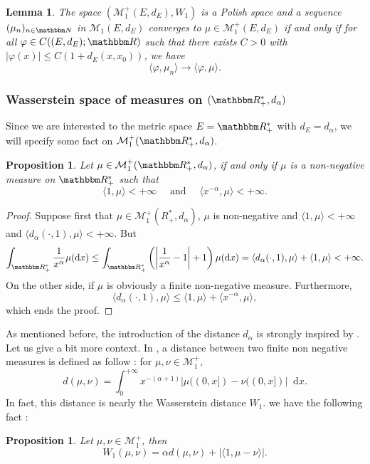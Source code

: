 \documentclass[a4paper,11pt, reqno]{amsart}
\newcommand{\cM}{\mathcal{M}}	\newcommand{\MM}{\mathbbm{M}}
\newcommand{\dd}{\mathop{}\!\mathrm{d}}
\newcommand{\1}{\mathbbm{1}}
\theoremstyle{plain}
\newtheorem{lemma}[theorem]{Lemma}
\newtheorem{proposition}[theorem]{Proposition}
\theoremstyle{definition}
\begin{document}
\begin{lemma}
  \label{lemma:CV-Wasserstein-linear}The space $(\cM_1^+ (E, d_E),
  W_1)$ is a Polish space and a sequence $(\mu_n)_{n \in \NN}$ in
  $\cM_1 (E, d_E)$ converges to $\mu \in \cM_1^+ (E, d_E)$ if
  and only if for all $\varphi \in C ((E, d_E) ; \RR)$ such that
  there exists $C > 0$ with $| \varphi (x) | \le C (1 + d_E (x, x_0))$,
  we have
  \[ \langle \varphi, \mu_n \rangle \rightarrow \langle \varphi, \mu \rangle .
  \]
\end{lemma}

\subsubsection{Wasserstein space of measures on $(\RR_+^{\ast},
d_{\alpha})$}

Since we are interested to the metric space $E =\RR_+^{\ast}$ with $d_E
= d_{\alpha}$, we will specify some fact on $\cM_1^+
(\RR_+^{\ast}, d_{\alpha})$.

\begin{proposition}
  \label{prop:equivalence-M1}Let $\mu \in \cM_1^+
  (\RR_+^{\ast}, d_{\alpha})$, if and only if $\mu$ is a non-negative
  measure on $\RR_+^{\ast}$ such that
  \[ \langle 1, \mu \rangle < + \infty \quad  \text{ and } \quad \langle x^{-
     \alpha}, \mu \rangle < + \infty . \]
\end{proposition}

\begin{proof}
  Suppose first that $\mu \in \cM_1^+ (R^{\ast}_+, d_{\alpha})$, $\mu$
  is non-negative and $\langle 1, \mu \rangle < + \infty$ and $\langle
  d_{\alpha} ( \cdot, 1), \mu \rangle < + \infty$. But
  \[ \int_{\RR^{\ast}_+} \frac{1}{x^{\alpha}} \mu (\dd x) \le
     \int_{\RR^{\ast}_+} \left( \left| \frac{1}{x^{\alpha}} - 1 \right|
     + 1 \right) \mu (\dd x) = \langle d_{\alpha} (\cdot, 1),
     \mu \rangle + \langle 1, \mu \rangle < + \infty . \]
  On the other side, if $\mu$ is obviously a finite non-negative measure.
  Furthermore,
  \[ \langle d_{\alpha} ( \cdot, 1), \mu \rangle \le \langle
     1, \mu \rangle + \langle x^{- \alpha}, \mu \rangle, \]
  which ends the proof.
\end{proof}

As mentioned before, the introduction of the distance $d_\alpha$ is strongly inspired by \cite{cepedaSmoluchowskisEquationRate2011a}. Let us give a bit more context. In \cite[Definition 2.2]{cepedaSmoluchowskisEquationRate2011a}, a distance between two finite non negative measures is defined as follow : for $\mu,\nu \in \cM^+_{1}$, 
\[d(\mu,\nu) = \int_{0}^{+\infty} x^{-(\alpha + 1)} \left| \mu((0,x])- \nu((0,x])\right|\dd x.\]
In fact, this distance is nearly the Wasserstein distance $W_1$. we have the following fact :
\begin{proposition}
    Let $\mu,\nu \in \cM^+_1$, then
    \[
    W_1(\mu, \nu)= \alpha d(\mu,\nu) + |\langle1, \mu-\nu \rangle|.
    \]
\end{proposition}
\end{document}
